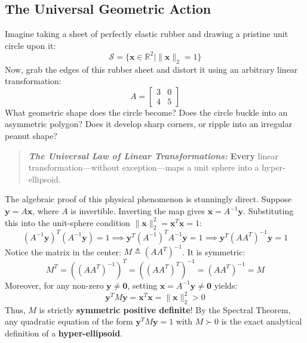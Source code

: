 \subsection{The Universal Geometric Action}
Imagine taking a sheet of perfectly elastic rubber and drawing a pristine unit circle upon it:
\begin{equation}
\mathcal{S} = \{\mathbf{x} \in \mathbb{R}^2 \mid \|\mathbf{x}\|_2 = 1\}
\end{equation}
Now, grab the edges of this rubber sheet and distort it using an arbitrary linear transformation:
\begin{equation}
A = \begin{bmatrix} 3 & 0 \\ 4 & 5 \end{bmatrix}
\end{equation}
What geometric shape does the circle become? Does the circle buckle into an asymmetric polygon? Does it develop sharp corners, or ripple into an irregular peanut shape?

\begin{quote}
\textit{\textbf{The Universal Law of Linear Transformations:}} \textbf{Every} linear transformation—without exception—maps a unit sphere into a hyper-ellipsoid. 
\end{quote}

The algebraic proof of this physical phenomenon is stunningly direct. Suppose $\mathbf{y} = A\mathbf{x}$, where $A$ is invertible. Inverting the map gives $\mathbf{x} = A^{-1} \mathbf{y}$. Substituting this into the unit-sphere condition $\|\mathbf{x}\|_2^2 = \mathbf{x}^T \mathbf{x} = 1$:
\begin{equation}
(A^{-1} \mathbf{y})^T (A^{-1} \mathbf{y}) = 1 \implies \mathbf{y}^T (A^{-1})^T A^{-1} \mathbf{y} = 1 \implies \mathbf{y}^T (A A^T)^{-1} \mathbf{y} = 1
\label{eq:ellipsoid_derivation}
\end{equation}
Notice the matrix in the center: $M \triangleq (A A^T)^{-1}$. It is symmetric:
\begin{equation}
M^T = \left( (A A^T)^{-1} \right)^T = ((A A^T)^T)^{-1} = (A A^T)^{-1} = M
\end{equation}
Moreover, for any non-zero $\mathbf{y} \ne \mathbf{0}$, setting $\mathbf{x} = A^{-1} \mathbf{y} \ne \mathbf{0}$ yields:
\begin{equation}
\mathbf{y}^T M \mathbf{y} = \mathbf{x}^T \mathbf{x} = \|\mathbf{x}\|_2^2 > 0
\end{equation}
Thus, $M$ is strictly \textbf{symmetric positive definite}! By the Spectral Theorem, any quadratic equation of the form $\mathbf{y}^T M \mathbf{y} = 1$ with $M \succ 0$ is the exact analytical definition of a \textbf{hyper-ellipsoid}.

